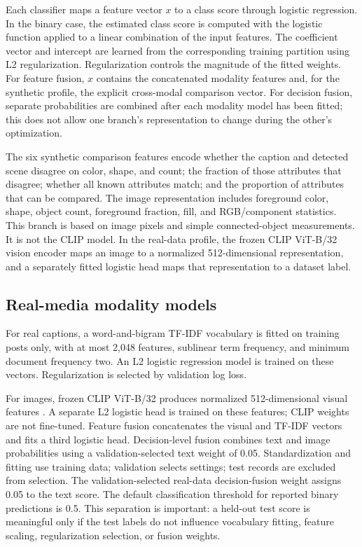 \documentclass[conference]{IEEEtran}
\begin{document}
Each classifier maps a feature vector $x$ to a class score through logistic regression. In the binary case, the estimated class score is computed with the logistic function applied to a linear combination of the input features. The coefficient vector and intercept are learned from the corresponding training partition using L2 regularization. Regularization controls the magnitude of the fitted weights. For feature fusion, $x$ contains the concatenated modality features and, for the synthetic profile, the explicit cross-modal comparison vector. For decision fusion, separate probabilities are combined after each modality model has been fitted; this does not allow one branch's representation to change during the other's optimization.

The six synthetic comparison features encode whether the caption and detected scene disagree on color, shape, and count; the fraction of those attributes that disagree; whether all known attributes match; and the proportion of attributes that can be compared. The image representation includes foreground color, shape, object count, foreground fraction, fill, and RGB/component statistics. This branch is based on image pixels and simple connected-object measurements. It is not the CLIP model. In the real-data profile, the frozen CLIP ViT-B/32 vision encoder maps an image to a normalized 512-dimensional representation, and a separately fitted logistic head maps that representation to a dataset label.
\subsection{Real-media modality models}
For real captions, a word-and-bigram TF-IDF vocabulary is fitted on training posts only, with at most 2,048 features, sublinear term frequency, and minimum document frequency two. An L2 logistic regression model is trained on these vectors. Regularization is selected by validation log loss.

For images, frozen CLIP ViT-B/32 produces normalized 512-dimensional visual features \cite{radford}. A separate L2 logistic head is trained on these features; CLIP weights are not fine-tuned. Feature fusion concatenates the visual and TF-IDF vectors and fits a third logistic head. Decision-level fusion combines text and image probabilities using a validation-selected text weight of 0.05. Standardization and fitting use training data; validation selects settings; test records are excluded from selection. The validation-selected real-data decision-fusion weight assigns 0.05 to the text score. The default classification threshold for reported binary predictions is 0.5. This separation is important: a held-out test score is meaningful only if the test labels do not influence vocabulary fitting, feature scaling, regularization selection, or fusion weights.
\end{document}
